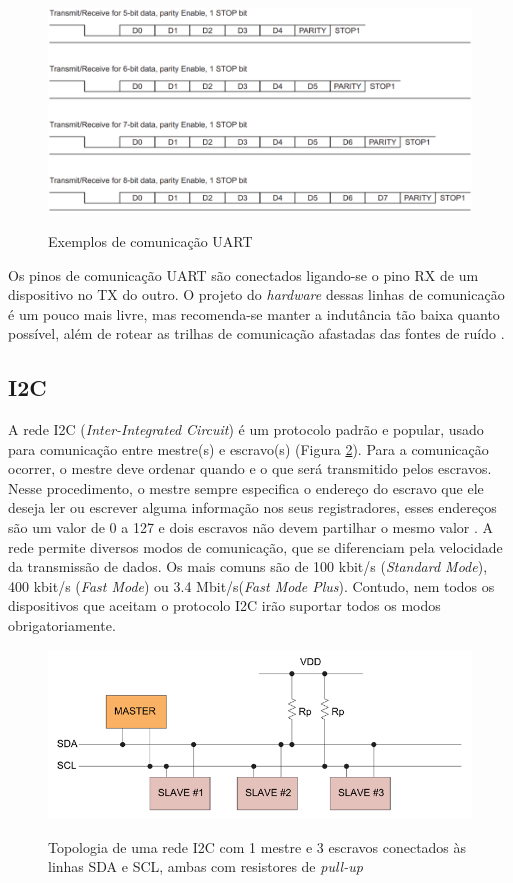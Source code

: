 \begin{figure}[!htb]
	\centering
	\caption{Exemplos de comunicação UART}
	\includegraphics[width=\linewidth]{figuras/uartcommunication}
	\label{fig:uartcommunication}
\end{figure}

Os pinos de comunicação UART são conectados ligando-se o pino RX de um dispositivo no TX do outro. O projeto do \textit{hardware} dessas linhas de comunicação é um pouco mais livre, mas recomenda-se manter a indutância tão baixa quanto possível, além de rotear as trilhas de comunicação afastadas das fontes de ruído \cite{site:altiumpcb}.

\subsection{I2C}

A rede I2C (\textit{Inter-Integrated Circuit}) é um protocolo padrão e popular, usado para comunicação entre mestre(s) e escravo(s) (Figura \ref{fig:i2connection}). 
Para a comunicação ocorrer, o mestre deve ordenar quando e o que será transmitido pelos escravos. Nesse procedimento, o mestre sempre especifica o endereço do escravo que ele deseja ler ou escrever alguma informação nos seus registradores, esses endereços são um valor de 0 a 127 e dois escravos não devem partilhar o mesmo valor \cite{man:texasI2C}. A rede permite diversos modos de comunicação, que se diferenciam pela velocidade da transmissão de dados. Os mais comuns são de 100 kbit/s (\textit{Standard Mode}), 400 kbit/s (\textit{Fast Mode}) ou 3.4 Mbit/s(\textit{Fast Mode Plus}). Contudo, nem todos os dispositivos que aceitam o protocolo I2C irão suportar todos os modos obrigatoriamente.

\begin{figure}[!htb]
	\centering
	\caption{Topologia de uma rede I2C com 1 mestre e 3 escravos conectados às linhas SDA e SCL, ambas com resistores de \textit{pull-up}}
	\includegraphics[width=0.7\linewidth]{figuras/i2connection}
	\label{fig:i2connection}
\end{figure}

